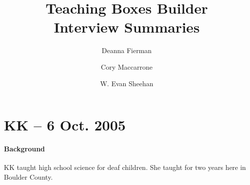 \documentclass[11pt,letter]{article}
\title{Teaching Boxes Builder \\ Interview Summaries}
\author{Deanna Fierman \and Cory Maccarrone \and W. Evan Sheehan}
\begin{document}
\begin{titlepage}
	\maketitle
	\thispagestyle{empty}
\end{titlepage}

\hfill
\thispagestyle{empty}
\pagebreak
\setcounter{page}{0}

\section{KK -- 6 Oct. 2005}
\paragraph{Background} KK taught high school science for deaf children. She
taught for two years here in Boulder County.
\end{document}
